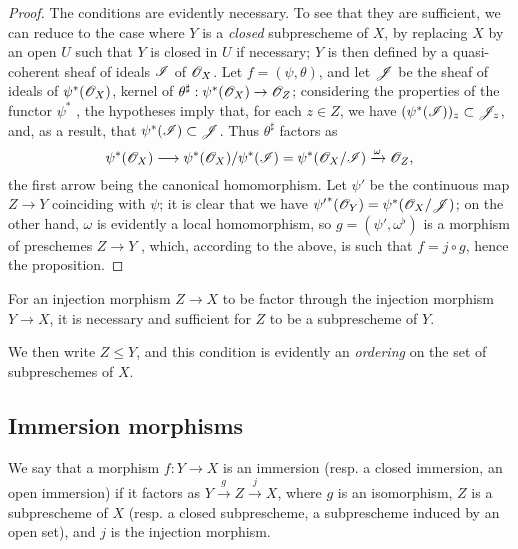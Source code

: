 \begin{proof}
\label{proof-1.4.1.9}
The conditions are evidently necessary.
To see that they are sufficient, we can reduce to the case where $Y$ is a \emph{closed} subprescheme of $X$, by replacing $X$ by an open $U$ such that $Y$ is closed in $U$  if necessary;
$Y$ is then defined by a quasi-coherent sheaf of ideals $\mathscr{I}$ of $\mathscr{O}_X$.
Let $f=(\psi,\theta)$, and let $\mathscr{J}$ be the sheaf of ideals of $\psi^*(\mathscr{O}_X)$, kernel of $\theta^\sharp:\psi^*(\sh{O}_X)\to\sh{O}_Z$;
considering the properties of the functor $\psi^*$ , the hypotheses imply that, for each $z\in Z$, we have $(\psi^*(\mathscr{I}))_z\subset\mathscr{J}_z$, and, as a result, that $\psi^*(\mathscr{I})\subset\mathscr{J}$.
Thus $\theta^\sharp$ factors as
\[
  \psi^*(\sh{O}_X)\to\psi^*(\sh{O}_X)/\psi^*(\sh{I})=\psi^*(\sh{O}_X/\sh{I})\xrightarrow{\omega}\sh{O}_Z,
\]
the first arrow being the canonical homomorphism.
Let $\psi'$ be the continuous map $Z\to Y$ coinciding with $\psi$;
it is clear that we have ${\psi'}^*(\mathscr{O}_Y)=\psi^*(\mathscr{O}_X/\mathscr{J})$;
on the other hand, $\omega$ is evidently a local homomorphism, so $g=(\psi',\omega^\flat)$ is a morphism
of preschemes $Z\to Y$ , which, according to the above, is such that $f=j\circ g$, hence the proposition.
\end{proof}

\begin{corollary}[4.1.10]
\label{I.4.1.10}
For an injection morphism $Z\to X$ to be factor through the injection morphism $Y\to X$, it is necessary and sufficient for $Z$ to be a subprescheme of $Y$.
\end{corollary}

We then write $Z\leq Y$, and this condition is evidently an \emph{ordering} on the set of subpreschemes of $X$.

\subsection{Immersion morphisms}
\label{subsection:I.4.2}

\begin{definition}[4.2.1]
\label{I.4.2.1}
We say that a morphism $f:Y\to X$ is an immersion (resp. a closed immersion, an open immersion) if it factors as $Y\xrightarrow{g}Z\xrightarrow{j}X$, where $g$ is an isomorphism, $Z$ is a subprescheme of $X$ (resp. a closed subprescheme, a subprescheme induced by an open set), and $j$ is the injection morphism.
\end{definition}

